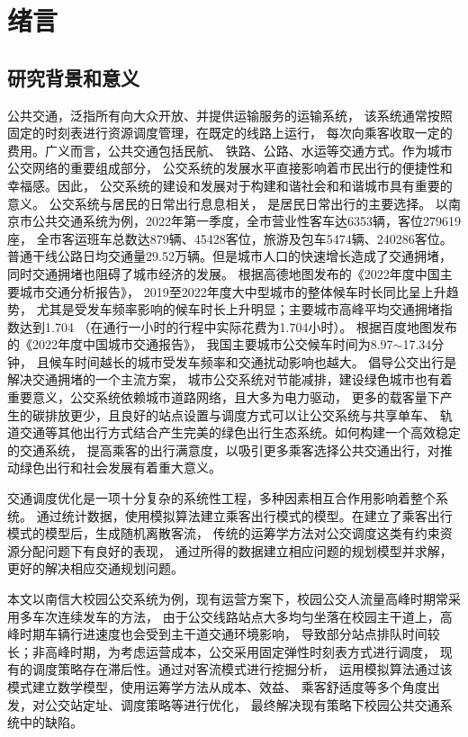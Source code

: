 \section{绪言}
\subsection{研究背景和意义}
公共交通，泛指所有向大众开放、并提供运输服务的运输系统，
该系统通常按照固定的时刻表进行资源调度管理，在既定的线路上运行，
每次向乘客收取一定的费用。广义而言，公共交通包括民航、
铁路、公路、水运等交通方式。作为城市公交网络的重要组成部分，
公交系统的发展水平直接影响着市民出行的便捷性和幸福感。因此，
公交系统的建设和发展对于构建和谐社会和和谐城市具有重要的意义。
公交系统与居民的日常出行息息相关，
是居民日常出行的主要选择。
以南京市公共交通系统为例，2022年第一季度，全市营业性客车达6353辆，客位279619座，
全市客运班车总数达879辆、45428客位，旅游及包车5474辆、240286客位。
普通干线公路日均交通量29.52万辆\cite{njjt}。但是城市人口的快速增长造成了交通拥堵，同时交通拥堵也阻碍了城市经济的发展。
根据高德地图发布的《2022年度中国主要城市交通分析报告\cite{x1}》，
2019至2022年度大中型城市的整体候车时长同比呈上升趋势，
尤其是受发车频率影响的候车时长上升明显；主要城市高峰平均交通拥堵指数达到1.704
（在通行一小时的行程中实际花费为1.704小时）。
根据百度地图发布的《2022年度中国城市交通报告\cite{bd}》，
我国主要城市公交候车时间为8.97$ \sim $17.34分钟，
且候车时间越长的城市受发车频率和交通扰动影响也越大。
倡导公交出行是解决交通拥堵的一个主流方案，
城市公交系统对节能减排，建设绿色城市也有着重要意义，公交系统依赖城市道路网络，且大多为电力驱动，
更多的载客量下产生的碳排放更少，且良好的站点设置与调度方式可以让公交系统与共享单车、
轨道交通等其他出行方式结合产生完美的绿色出行生态系统。如何构建一个高效稳定的交通系统，
提高乘客的出行满意度，以吸引更多乘客选择公共交通出行，对推动绿色出行和社会发展有着重大意义。


交通调度优化是一项十分复杂的系统性工程，多种因素相互合作用影响着整个系统。
通过统计数据，使用模拟算法建立乘客出行模式的模型。在建立了乘客出行模式的模型后，生成随机离散客流，
传统的运筹学方法对公交调度这类有约束资源分配问题下有良好的表现，
通过所得的数据建立相应问题的规划模型并求解，更好的解决相应交通规划问题。


本文以南信大校园公交系统为例，现有运营方案下，校园公交人流量高峰时期常采用多车次连续发车的方法，
由于公交线路站点大多均匀坐落在校园主干道上，高峰时期车辆行进速度也会受到主干道交通环境影响，
导致部分站点排队时间较长；非高峰时期，为考虑运营成本，公交采用固定弹性时刻表方式进行调度，
现有的调度策略存在滞后性。通过对客流模式进行挖掘分析，
运用模拟算法通过该模式建立数学模型，使用运筹学方法从成本、效益、
乘客舒适度等多个角度出发，对公交站定址、调度策略等进行优化，
最终解决现有策略下校园公共交通系统中的缺陷。


